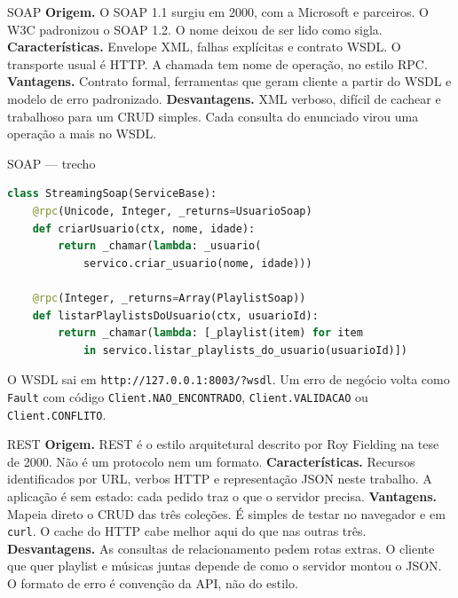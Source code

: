 \documentclass[aspectratio=169,11pt]{beamer}
\begin{document}
\begin{frame}{SOAP}
  \textbf{Origem.} O SOAP 1.1 surgiu em 2000, com a Microsoft e parceiros. O W3C padronizou o SOAP 1.2. O nome deixou de ser lido como sigla.
  \vspace{0.35em}
  \textbf{Características.} Envelope XML, falhas explícitas e contrato WSDL. O transporte usual é HTTP. A chamada tem nome de operação, no estilo RPC.
  \vspace{0.35em}
  \textbf{Vantagens.} Contrato formal, ferramentas que geram cliente a partir do WSDL e modelo de erro padronizado.
  \vspace{0.35em}
  \textbf{Desvantagens.} XML verboso, difícil de cachear e trabalhoso para um CRUD simples. Cada consulta do enunciado virou uma operação a mais no WSDL.
\end{frame}

\begin{frame}[fragile]{SOAP --- trecho}
\begin{lstlisting}[language=Python]
class StreamingSoap(ServiceBase):
    @rpc(Unicode, Integer, _returns=UsuarioSoap)
    def criarUsuario(ctx, nome, idade):
        return _chamar(lambda: _usuario(
            servico.criar_usuario(nome, idade)))

    @rpc(Integer, _returns=Array(PlaylistSoap))
    def listarPlaylistsDoUsuario(ctx, usuarioId):
        return _chamar(lambda: [_playlist(item) for item
            in servico.listar_playlists_do_usuario(usuarioId)])
\end{lstlisting}
O WSDL sai em \texttt{http://127.0.0.1:8003/?wsdl}. Um erro de negócio volta como \texttt{Fault} com código \texttt{Client.NAO\_ENCONTRADO}, \texttt{Client.VALIDACAO} ou \texttt{Client.CONFLITO}.
\end{frame}

\begin{frame}{REST}
  \textbf{Origem.} REST é o estilo arquitetural descrito por Roy Fielding na tese de 2000. Não é um protocolo nem um formato.
  \vspace{0.35em}
  \textbf{Características.} Recursos identificados por URL, verbos HTTP e representação JSON neste trabalho. A aplicação é sem estado: cada pedido traz o que o servidor precisa.
  \vspace{0.35em}
  \textbf{Vantagens.} Mapeia direto o CRUD das três coleções. É simples de testar no navegador e em \texttt{curl}. O cache do HTTP cabe melhor aqui do que nas outras três.
  \vspace{0.35em}
  \textbf{Desvantagens.} As consultas de relacionamento pedem rotas extras. O cliente que quer playlist e músicas juntas depende de como o servidor montou o JSON. O formato de erro é convenção da API, não do estilo.
\end{frame}
\end{document}

